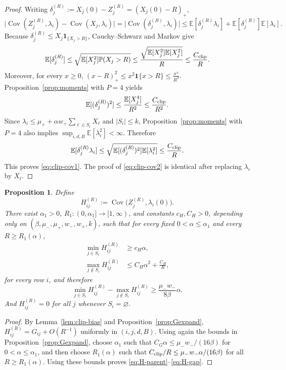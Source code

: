 \documentclass{article}
\newtheorem{proposition}{Proposition}[section]
\newcommand{\Pbb}{\mathbb{P}}
\newcommand{\E}{\mathbb{E}}
\newcommand{\Cov}{\operatorname{Cov}}
\newcommand{\ind}{\mathbf 1}
\newcommand{\abs}[1]{\lvert #1\rvert}
\begin{document}
\begin{proof}
Writing $\delta_j^{(R)}:=X_j(0)-Z_j^{(R)}=(X_j(0)-R)_+$,
\[
\abs{\Cov(Z_j^{(R)},\lambda_i)-\Cov(X_j,\lambda_i)}=\abs{\Cov(\delta_j^{(R)},\lambda_i)}
\le
\E[\delta_j^{(R)}\lambda_i]+
\E[\delta_j^{(R)}]\E[\lambda_i].
\]
Because $\delta_j^{(R)}\le X_j\ind_{\{X_j>R\}}$, Cauchy--Schwarz and Markov give
\[
\E[\delta_j^{(R)}]
\le
\sqrt{\E[X_j^2]\Pbb(X_j>R)}
\le
\frac{\sqrt{\E[X_j^2]\E[X_j^2]}}{R}
\le \frac{C_{\rm clip}}{R}.
\]
Moreover, for every $x\ge 0$, $(x-R)_+^2\le x^2\ind\{x>R\}\le \frac{x^4}{R^2}$. Proposition~\ref{prop:moments} with $P=4$ yields
\begin{equation}
\label{eq:delta-second-moment-main}
\E[(\delta_j^{(R)})^2]\le \frac{\E[X_j^4]}{R^2}\le \frac{C_{\rm clip}}{R^2}.
\end{equation}
Since $\lambda_i\le \mu_+ + \alpha w_+\sum_{\ell\in S_i}X_\ell$ and $|S_i|\le k$, Proposition~\ref{prop:moments} with $P=4$ also implies $\sup_{i,d,B}\E[\lambda_i^2]<\infty$. Therefore
\[
\E[\delta_j^{(R)}\lambda_i]
\le
\sqrt{\E[(\delta_j^{(R)})^2]\E[\lambda_i^2]}
\le
\frac{C_{\rm clip}}{R}.
\]
This proves \eqref{eq:clip-cov1}. The proof of \eqref{eq:clip-cov2} is identical after replacing $\lambda_i$ by $X_\ell$.
\end{proof}
\begin{proposition}
\label{prop:clipped-screen-gap}
Define
\[
H_{ij}^{(R)}:=\Cov\bigl(Z_j^{(R)},\lambda_i(0)\bigr).
\]
There exist $\alpha_1>0$, $R_1:(0,\alpha_1]\to[1,\infty)$, and constants $c_H,C_H>0$, depending only on $(\beta,\mu_-,\mu_+,w_-,w_+,k)$, such that for every fixed $0<\alpha\le \alpha_1$ and every $R\ge R_1(\alpha)$,
\begin{align}
\label{eq:H-parent}
\min_{j\in S_i}H_{ij}^{(R)} &\ge c_H\alpha,\\
\label{eq:H-nonparent}
\max_{j\notin S_i}H_{ij}^{(R)} &\le C_H\alpha^2 + \frac{C_H}{R},
\end{align}
for every row $i$, and therefore
\begin{equation}
\label{eq:H-gap}
\min_{j\in S_i}H_{ij}^{(R)} - \max_{j\notin S_i}H_{ij}^{(R)}
\ge \frac{\mu_-w_-}{8\beta}\alpha.
\end{equation}
And $H_{ij}^{(R)}=0$ for all $j$ whenever $S_i=\varnothing$.
\end{proposition}

\begin{proof}
By Lemma~\ref{lem:clip-bias} and Proposition~\ref{prop:Gexpand}, $H_{ij}^{(R)} = G_{ij} + O(R^{-1})$ uniformly in $(i,j,d,B)$. Using again the bounds in Proposition~\ref{prop:Gexpand}, choose $\alpha_1$  such that $C_G\alpha\le \mu_-w_-/(16\beta)$ for $0<\alpha\le \alpha_1$, and then choose $R_1(\alpha)$ such that $C_{\rm clip}/R\le \mu_-w_-\alpha/(16\beta)$ for all $R\ge R_1(\alpha)$. Using these bounds proves \eqref{eq:H-parent}--\eqref{eq:H-gap}.
\end{proof}
\end{document}
